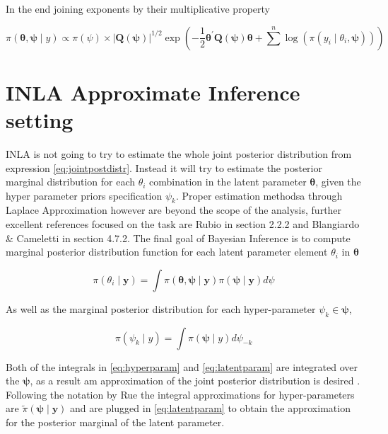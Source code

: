 \documentclass[
  12pt,
  a4paper,
  oneside]{book}
\theoremstyle{definition}
\theoremstyle{definition}
\theoremstyle{definition}
\theoremstyle{remark}
\begin{document}
In the end joining exponents by their multiplicative property

\begin{equation}
\pi(\boldsymbol{\theta}, \boldsymbol{\psi} \mid y) \propto \pi(\psi) \times|\boldsymbol{Q}(\boldsymbol{\psi})|^{1 / 2} \exp \left(-\frac{1}{2} \boldsymbol{\theta}^{\prime} \boldsymbol{Q}(\boldsymbol{\psi}) \boldsymbol{\theta}+\sum^{n} \log \left(\pi\left(y_{i} \mid \theta_{i}, \boldsymbol{\psi}\right)\right)\right)
\label{eq:jointpostdistr}
\end{equation}

\hypertarget{approx}{%
\section{INLA Approximate Inference setting}\label{approx}}

INLA is not going to try to estimate the whole joint posterior distribution from expression \eqref{eq:jointpostdistr}. Instead it will try to estimate the posterior marginal distribution for each \(\theta_{i}\) combination in the latent parameter \(\boldsymbol{\theta}\), given the hyper parameter priors specification \(\psi_{k}\). Proper estimation methodsa through Laplace Approximation however are beyond the scope of the analysis, further excellent references focused on the task are Rubio \citeyearpar{Bayesian_INLA_Rubio} in section 2.2.2 and Blangiardo \& Cameletti \citeyearpar{Blangiardo-Cameletti} in section 4.7.2.
The final goal of Bayesian Inference is to compute marginal posterior distribution function for each latent parameter element \(\theta_{i}\) in \(\boldsymbol\theta\)

\begin{equation}
  \pi(\theta_{i} \mid \boldsymbol{y})=\int \pi(\boldsymbol{\theta}, \boldsymbol{\psi} \mid \mathbf{y}) \pi(\boldsymbol{\psi} \mid \mathbf{y}) d \psi
\label{eq:latentparam}
\end{equation}

As well as the marginal posterior distribution for each hyper-parameter \(\psi_{k} \in \boldsymbol\psi\),

\begin{equation}
  \pi\left(\psi_{k} \mid y\right)=\int \pi(\boldsymbol{\psi} \mid y) d \psi_{-k}
  \label{eq:hyperparam}
\end{equation}

Both of the integrals in \eqref{eq:hyperparam} and \eqref{eq:latentparam} are integrated over the \(\boldsymbol\psi\), as a result am approximation of the joint posterior distribution is desired \citep{Krainski2018}. Following the notation by Rue \citeyearpar{Rue2009} the integral approximations for hyper-parameters are \(\tilde\pi\left(\boldsymbol{\psi} \mid \boldsymbol{y}\right)\) and are plugged in \eqref{eq:latentparam} to obtain the approximation for the posterior marginal of the latent parameter.
\end{document}
